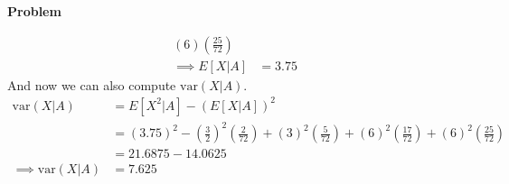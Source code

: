 \documentclass[12pt]{article}
\newenvironment{Ex}{\textbf{Problem}\vspace{.75em}\\}{}
\begin{document}
\begin{enumerate}
\begin{Ex}
\begin{solution}
\begin{enumerate}
\begin{equation}
\begin{aligned}
            (6)\left(\frac{25}{72}\right) \\
            \implies E[X|A] &= 3.75
          \end{aligned}
        \end{equation}
        And now we can also compute $\text{var}(X|A)$.
        \begin{equation}
          \label{eq:2g-var-x-given-a}
          \begin{aligned}
            \text{var}(X|A) &= E[X^2|A] - (E[X|A])^2 \\
            &= (3.75)^2 -
            \left(\frac{3}{2}\right)^2\left(\frac{2}{72}\right) +
            (3)^2\left(\frac{5}{72}\right) +
            (6)^2\left(\frac{17}{72}\right) +
            (6)^2\left(\frac{25}{72}\right) \\
            &= 21.6875 - 14.0625 \\
            \implies \text{var}(X|A) &= 7.625 \\
          \end{aligned}
        \end{equation}


\end{enumerate}
\end{solution}
\end{Ex}
\end{enumerate}
\end{document}

